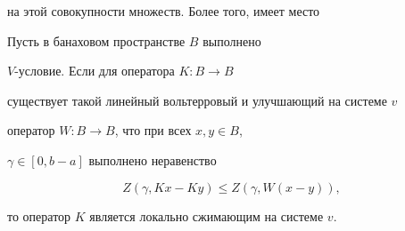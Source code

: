 на этой совокупности множеств. Более того, имеет место








\begin{thm}


Пусть в банаховом пространстве $B$ выполнено


$V$-условие. Если для оператора $K:B \to B$


существует такой линейный вольтерровый и улучшающий на системе $v$


оператор $W:B \to B$, что при всех $x, y\in B$,


$\gamma\in [0, b-a]$ выполнено неравенство


\begin{equation}\label{5naoz}


Z(\gamma,K x-K y) \leqslant Z(\gamma, W(x- y)),


\end{equation}


то оператор $K$ является локально сжимающим на системе $v$.


\end{thm}








